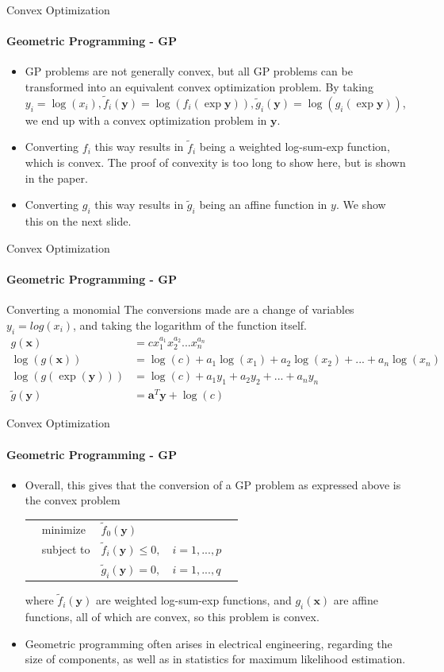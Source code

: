 \documentclass{beamer}
\renewcommand{\vec}{\mathbf}
\begin{document}
	\begin{frame}{Convex Optimization}
		\framesubtitle{Geometric Programming - GP}
		\begin{itemize}
			\item GP problems are not generally convex, but all GP problems can be transformed into an equivalent convex optimization problem. By taking $y_i=\log(x_i), \tilde{f}_i(\vec{y})=\log(f_i(\exp{\vec{y}})), \tilde{g}_i(\vec{y})=\log(g_i(\exp{\vec{y}}))$, we end up with a convex optimization problem in $\vec{y}$.
			\item Converting $f_i$ this way results in $\tilde{f}_i$ being a weighted log-sum-exp function, which is convex. The proof of convexity is too long to show here, but is shown in the paper.
			\item Converting $g_i$ this way results in $\tilde{g}_i$ being an affine function in $y$. We show this on the next slide.
		\end{itemize}
	\end{frame}

	\begin{frame}{Convex Optimization}
		\framesubtitle{Geometric Programming - GP}
		\begin{block}{Converting a monomial}
			The conversions made are a change of variables $y_i = log(x_i)$, and taking the logarithm of the function itself.
			\begin{align*}
				g(\vec{x}) &= cx_1^{a_1}x_2^{a_2}...x_n^{a_n}\\
				\log(g(\vec{x})) &= \log(c) + a_1\log(x_1) + a_2\log(x_2) + ... + a_n\log(x_n)\\
				\log(g(\exp(\vec{y}))) &= \log(c) + a_1y_1 + a_2y_2 + ... + a_ny_n\\
				\tilde{g}(\vec{y}) &= \vec{a}^T\vec{y} + \log(c)
			\end{align*}
		\end{block}
	\end{frame}

	\begin{frame}{Convex Optimization}
		\framesubtitle{Geometric Programming - GP}
		\begin{itemize}
			\item Overall, this gives that the conversion of a GP problem as expressed above is the convex problem
			\begin{tabularx}{\textwidth}{X l l l X}
				& minimize		& $\tilde{f}_0(\vec{y})$	& &\\
				& subject to	& $\tilde{f}_i(\vec{y}) \leq 0,$	& $i=1,...,p$ &\\
				&				& $\tilde{g}_i(\vec{y}) = 0,$ & $i=1,...,q$ &
			\end{tabularx}
			where $\tilde{f}_i(\vec{y})$ are weighted log-sum-exp functions, and $g_i(\vec{x})$ are affine functions, all of which are convex, so this problem is convex.
			\item Geometric programming often arises in electrical engineering, regarding the size of components, as well as in statistics for maximum likelihood estimation.
		\end{itemize}
	\end{frame}
	
\end{document}
